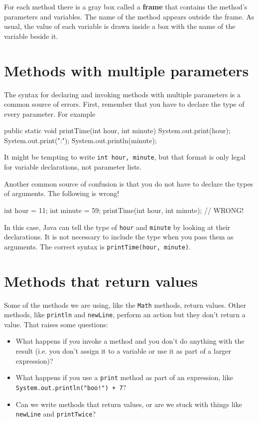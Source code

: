 For each method there is a gray box called a {\bf frame} that contains
the method's parameters and variables.  The name of the method
appears outside the frame.  As usual, the value of each variable
is drawn inside a box with the name of the variable beside it.



\section{Methods with multiple parameters}
\label{time}

The syntax for declaring and invoking methods with multiple
parameters is a common source of errors.  First, remember
that you have to declare the type of every parameter.  For
example

\begin{code}
    public static void printTime(int hour, int minute) {
        System.out.print(hour);
        System.out.print(":");
        System.out.println(minute);
    }
\end{code}
%
It might be tempting to write {\tt int hour, minute}, but
that format is only legal for variable declarations, not
parameter lists.

Another common source of confusion is that you do not have
to declare the types of arguments.  The following is wrong!

\begin{code}
    int hour = 11;
    int minute = 59;
    printTime(int hour, int minute);   // WRONG!
\end{code}
%
In this case, Java can tell the type of {\tt hour}
and {\tt minute} by looking at their declarations.  It is
not necessary to include the type when you pass them
as arguments.  The correct
syntax is {\tt printTime(hour, minute)}.


\section{Methods that return values}

Some of the methods we are using,
like the {\tt Math} methods, return values.  Other methods,
like {\tt println} and {\tt newLine}, perform an action but
they don't return a value.  That raises some questions:

\begin{itemize}

\item What happens if you invoke a method and you don't
do anything with the result (i.e. you don't assign it to
a variable or use it as part of a larger expression)?

\item What happens if you use a {\tt print} method as part
of an expression, like {\tt System.out.println("boo!") + 7}?

\item Can we write methods that return values, or are we
stuck with things like {\tt newLine} and {\tt printTwice}?

\end{itemize}

